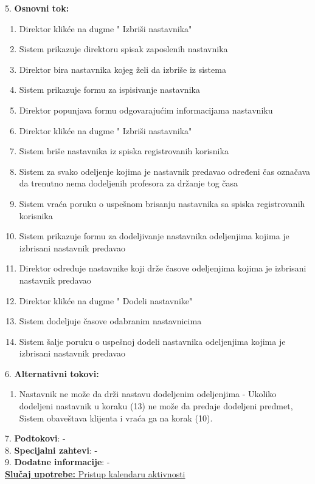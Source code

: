 \documentclass{article}
\begin{document}
5. \textbf{Osnovni tok:} 
\begin{enumerate} 
\item Direktor klikće na dugme " Izbriši nastavnika"
\item Sistem prikazuje direktoru spisak zaposlenih nastavnika
\item Direktor bira nastavnika kojeg želi da izbriše iz sistema
\item Sistem prikazuje formu za ispisivanje nastavnika
\item Direktor popunjava formu odgovarajućim informacijama nastavniku
\item Direktor klikće na dugme " Izbriši  nastavnika"
\item Sistem briše nastavnika iz spiska registrovanih korisnika
\item Sistem za svako odeljenje kojima je nastavnik predavao određeni čas označava da trenutno nema dodeljenih profesora za držanje tog časa
\item Sistem vraća poruku o uspešnom brisanju nastavnika sa spiska registrovanih korisnika
\item Sistem prikazuje formu za dodeljivanje nastavnika odeljenjima kojima je izbrisani nastavnik predavao
\item Direktor određuje nastavnike koji drže časove odeljenjima kojima je izbrisani nastavnik predavao
\item Direktor klikće na dugme " {Dodeli} nastavnike"
\item Sistem dodeljuje časove odabranim nastavnicima
\item Sistem šalje poruku o uspešnoj dodeli nastavnika odeljenjima kojima je izbrisani nastavnik predavao 
\end{enumerate}

6. \textbf{Alternativni tokovi:}
\begin{enumerate} 
\item Nastavnik ne može da drži nastavu dodeljenim odeljenjima - Ukoliko dodeljeni nastavnik u koraku (13) ne može da predaje dodeljeni predmet, Sistem obaveštava klijenta i vraća ga na korak (10).
\end{enumerate}

7. \textbf{Podtokovi}: - \\

8. \textbf{Specijalni zahtevi}: - \\

9. \textbf{Dodatne informacije}: - \\


\underline{\textbf{Slučaj upotrebe:} Pristup kalendaru aktivnosti} \\
\end{document}
